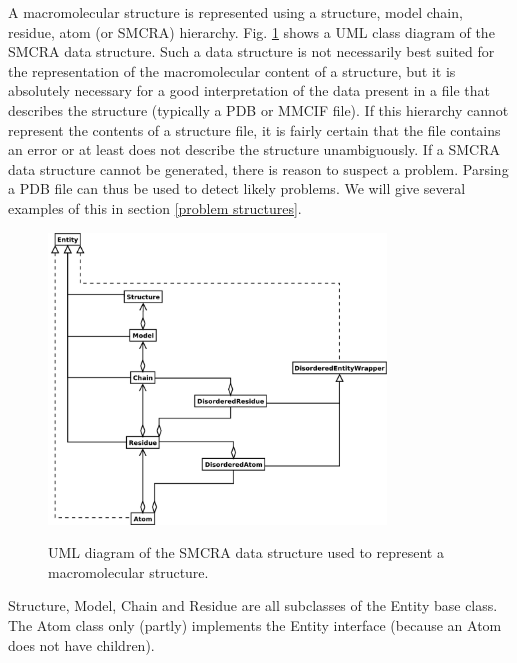 \documentclass{report}
\begin{document}
A macromolecular structure is represented using a structure, model chain,
residue, atom (or SMCRA) hierarchy. Fig. \ref{fig:smcra} shows a UML
class diagram of the SMCRA data structure.  Such a data structure is not
necessarily best suited for the representation of the macromolecular content of
a structure, but it is absolutely necessary for a good interpretation of the
data present in a file that describes the structure (typically a PDB or MMCIF
file). If this hierarchy cannot represent the contents of a structure file, it
is fairly certain that the file contains an error or at least does not describe
the structure unambiguously. If a SMCRA data structure cannot be generated,
there is reason to suspect a problem. Parsing a PDB file can thus be used to
detect likely problems. We will give several examples of this in section
\ref{problem structures}.

\begin{htmlonly}
\label{fig:smcra}
\end{htmlonly}

\begin{latexonly}
\begin{figure}[htbp]
\centering
\includegraphics[width=0.8\textwidth]{images/smcra.png}
\label{fig:smcra}
\caption{UML diagram of the SMCRA data structure
used to represent a macromolecular structure.}
\end{figure}
\end{latexonly}

Structure, Model, Chain and Residue are all subclasses of the Entity base class.
The Atom class only (partly) implements the Entity interface (because an Atom
does not have children).
\end{document}
